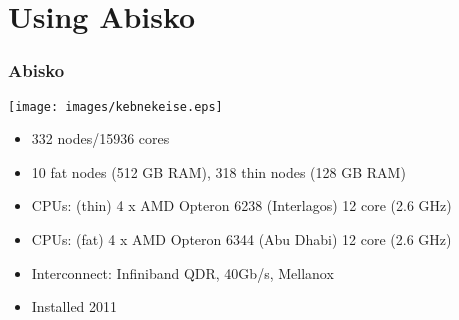 %

\section{Using Abisko}

\begin{frame}
	\frametitle{Abisko}
\texttt{[image: images/kebnekeise.eps]}
	\begin{itemize}
		\item	332 nodes/15936 cores
		\item	10 fat nodes (512 GB RAM), 318 thin nodes (128 GB RAM)
		\item	CPUs: (thin) 4 x AMD Opteron 6238 (Interlagos) 12 core (2.6 GHz)
		\item	CPUs: (fat) 4 x AMD Opteron 6344 (Abu Dhabi) 12 core (2.6 GHz)
		\item	Interconnect: Infiniband QDR, 40Gb/s, Mellanox
		\item	Installed 2011
	\end{itemize}
\end{frame}

